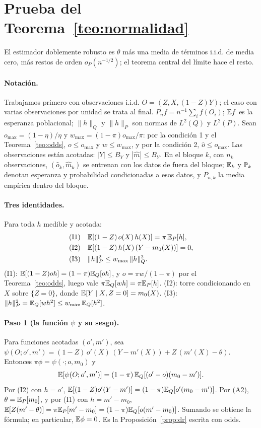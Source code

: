 \section{Prueba del Teorema~\ref{teo:normalidad}}\label{app:prueba}

El estimador doblemente robusto es $\theta$ más una media de términos i.i.d. de media cero, más restos de orden $o_P(n^{-1/2})$; el teorema central del límite hace el resto.

\paragraph{Notación.} Trabajamos primero con observaciones i.i.d. $O=(Z,X,(1-Z)Y)$; el caso con varias observaciones por unidad se trata al final. $P_nf=n^{-1}\sum_if(O_i)$; $\mathbb{E} f$ es la esperanza poblacional; $\|h\|_Q$ y $\|h\|_P$ son normas de $L^2(Q)$ y $L^2(P)$. Sean $o_{\max}=(1-\eta)/\eta$ y $w_{\max}=(1-\pi)o_{\max}/\pi$: por la condición 1 y el Teorema~\ref{teo:odds}, $o\le o_{\max}$ y $w\le w_{\max}$, y por la condición 2, $\hat o\le o_{\max}$. Las observaciones están acotadas: $|Y|\le B_Y$ y $|\hat m|\le B_Y$. En el bloque $k$, con $n_k$ observaciones, $(\hat o_k,\hat m_k)$ se entrenan con los datos de fuera del bloque; $\mathbb{E}_k$ y $\mathbb{P}_k$ denotan esperanza y probabilidad condicionadas a esos datos, y $P_{n,k}$ la media empírica dentro del bloque.

\paragraph{Tres identidades.} Para toda $h$ medible y acotada:
\begin{align*}
&\text{(I1)}\quad \mathbb{E}[(1-Z)\,o(X)\,h(X)]=\pi\,\mathbb{E}_P[h],\\
&\text{(I2)}\quad \mathbb{E}[(1-Z)\,h(X)\,(Y-m_0(X))]=0,\\
&\text{(I3)}\quad \|h\|_P^2\le w_{\max}\,\|h\|_Q^2 .
\end{align*}
(I1): $\mathbb{E}[(1-Z)oh]=(1-\pi)\mathbb{E}_Q[oh]$, y $o=\pi w/(1-\pi)$ por el Teorema~\ref{teo:odds}, luego vale $\pi\mathbb{E}_Q[wh]=\pi\mathbb{E}_P[h]$. (I2): torre condicionando en $X$ sobre $\{Z=0\}$, donde $\mathbb{E}[Y\mid X,Z=0]=m_0(X)$. (I3): $\|h\|_P^2=\mathbb{E}_Q[wh^2]\le w_{\max}\,\mathbb{E}_Q[h^2]$.

\paragraph{Paso 1 (la función $\psi$ y su sesgo).} Para funciones acotadas $(o',m')$, sea $\psi(O;o',m')=(1-Z)\,o'(X)\,(Y-m'(X))+Z\,(m'(X)-\theta)$. Entonces $\pi\phi=\psi(\cdot;o,m_0)$ y
\[
\mathbb{E}[\psi(O;o',m')]=(1-\pi)\,\mathbb{E}_Q[(o'-o)(m_0-m')].
\]
Por (I2) con $h=o'$, $\mathbb{E}[(1-Z)o'(Y-m')]=(1-\pi)\mathbb{E}_Q[o'(m_0-m')]$. Por (A2), $\theta=\mathbb{E}_P[m_0]$, y por (I1) con $h=m'-m_0$, $\mathbb{E}[Z(m'-\theta)]=\pi\mathbb{E}_P[m'-m_0]=(1-\pi)\mathbb{E}_Q[o(m'-m_0)]$. Sumando se obtiene la fórmula; en particular, $\mathbb{E}\phi=0$. Es la Proposición~\ref{prop:dr} escrita con odds.

